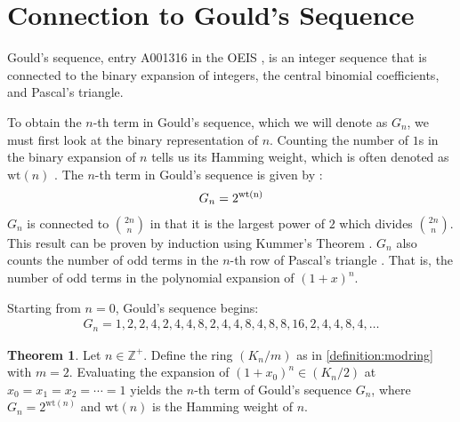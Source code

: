 \documentclass{article}
\theoremstyle{plain}
\theoremstyle{definition}
\newtheorem{theorem}{Theorem}
\newcommand{\Z}{\mathbb{Z}}
\newcommand{\K}{K}
\newcommand{\wt}[1]{\text{wt}(#1)}
\begin{document}
\section{Connection to Gould's Sequence}

Gould's sequence, entry A001316 in the OEIS \cite{A001316}, is an integer sequence that is connected to the binary expansion of integers, the central binomial coefficients, and Pascal's triangle.

To obtain the $n$-th term in Gould's sequence, which we will denote as $G_n$, we must first look at the binary representation of $n$. Counting the number of $1$s in the binary expansion of $n$ tells us its Hamming weight, which is often denoted as $\wt{n}$ \cite{Lin2004}. The $n$-th term in Gould's sequence is given by \cite{A001316}:
\begin{align}
    G_n = 2^\text{\wt{n}}
\end{align}
$G_n$ is connected to $\binom{2n}{n}$ in that it is the largest power of $2$ which divides $\binom{2n}{n}$. This result can be proven by induction using Kummer's Theorem \cite{Kummer1857}. $G_n$ also counts the number of odd terms in the $n$-th row of Pascal's triangle \cite{Glaisher1899}. That is, the number of odd terms in the polynomial expansion of $ (1+x)^n $.

Starting from $n=0$, Gould's sequence begins:
\begin{align}
    G_n = 1, 2, 2, 4, 2, 4, 4, 8, 2, 4, 4, 8, 4, 8, 8, 16, 2, 4, 4, 8, 4, \ldots
\end{align}

\begin{theorem}
\label{theorem:2}
Let $n \in \Z^+$. Define the ring $(\K_n/m)$ as in \cref{definition:modring} with $m=2$. Evaluating the expansion of $(1+x_0)^n \in (\K_n/2)$ at $x_0=x_1=x_2=\cdots=1$ yields the $n$-th term of Gould's sequence $G_n$, where $G_n = 2^{\wt{n}}$ and $\wt{n}$ is the Hamming weight of $n$.
\end{theorem}
\end{document}
